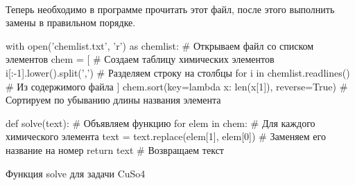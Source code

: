\documentclass[12pt]{article}
\begin{document}
    \paragraph{}
    Теперь необходимо в программе прочитать этот файл, после этого выполнить замены в правильном порядке.
    \begin{listing}[H]
        \begin{pythoncode}
with open('chemlist.txt', 'r') as chemlist:      # Открываем файл со списком элементов
    chem = [                                     # Создаем таблицу химических элементов
        i[:-1].lower().split(',')                # Разделяем строку на столбцы
        for i in chemlist.readlines()            # Из содержимого файла
    ]
chem.sort(key=lambda x: len(x[1]), reverse=True) # Сортируем по убыванию длины названия элемента

def solve(text):                                 # Объявляем функцию
    for elem in chem:                            # Для каждого химического элемента
        text = text.replace(elem[1], elem[0])    # Заменяем его название на номер
    return text                                  # Возвращаем текст
        \end{pythoncode}
        \caption{Функция solve для задачи CuSo4}
        \label{lst:solve23}
    \end{listing}
\end{document}
